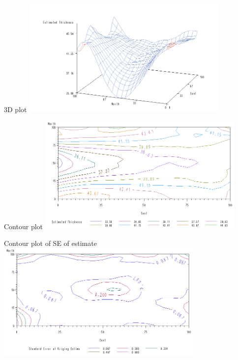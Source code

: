 \begin{frame}{3D plot}
  \includegraphics[width=4in]{krige3d}
\end{frame}

\begin{frame}{Contour plot}
  \includegraphics[width=4in]{krigecontour}
\end{frame}

\begin{frame}{Contour plot of SE of estimate}
  \includegraphics[width=4in]{krigesecontour}
\end{frame}




